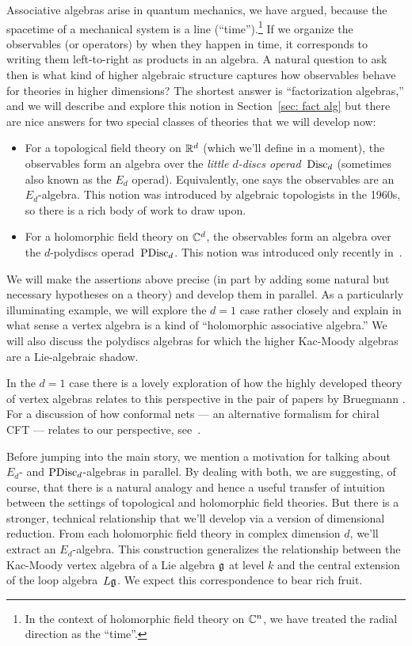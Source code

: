 \documentclass[11pt]{amsart}
\begin{document}
Associative algebras arise in quantum mechanics, we have argued, because the spacetime of a mechanical system is a line (``time'').\footnote{In the context of holomorphic field theory on ${\mathbb{C}}^n$, we have treated the radial direction as the ``time''.}
If we organize the observables (or operators) by when they happen in time,
it corresponds to writing them left-to-right as products in an algebra.
A natural question to ask then is what kind of higher algebraic structure captures how observables behave for theories in higher dimensions?
The shortest answer is ``factorization algebras,'' and we will describe and explore this notion in Section~\ref{sec: fact alg}
but there are nice answers for two special classes of theories that we will develop now:
\begin{itemize}
\item For a topological field theory on $\mathbb R^d$ (which we'll define in a moment),
the observables form an algebra over the {\em little $d$-discs operad}~${\rm Disc}_d$ (sometimes also known as the $E_d$ operad). 
Equivalently, one says the observables are an $E_d$-algebra. 
This notion was introduced by algebraic topologists in the 1960s, 
so there is a rich body of work to draw upon.
\item For a holomorphic field theory on $\mathbb C^d$,
the observables form an algebra over the $d$-polydiscs operad~${\rm PDisc}_d$.
This notion was introduced only recently in~\cite{CG1}.
\end{itemize}
We will make the assertions above precise (in part by adding some natural but necessary hypotheses on a theory)
and develop them in parallel.
As a particularly illuminating example, we will explore the $d=1$ case rather closely and explain in what sense a vertex algebra is a kind of ``holomorphic associative algebra.''
We will also discuss the polydiscs algebras for which the higher Kac-Moody algebras are a Lie-algebraic shadow.

\begin{rmk}
In the $d=1$ case there is a lovely exploration of how the highly developed theory of vertex algebras relates to this perspective in the pair of papers by Bruegmann \cite{Bruegmann1,Bruegmann2}.
For a discussion of how conformal nets --- an alternative formalism for chiral CFT --- relates to our perspective, see~\cite{Henriques, BPS}.
\end{rmk}

Before jumping into the main story, we mention a motivation for talking about $E_d$- and ${\rm PDisc}_d$-algebras in parallel.
By dealing with both, we are suggesting, of course, that there is a natural analogy and hence a useful transfer of intuition between the settings of topological and holomorphic field theories.
But there is a stronger, technical relationship that we'll develop via a version of dimensional reduction.
From each holomorphic field theory in complex dimension $d$, 
we'll extract an $E_d$-algebra.
This construction generalizes the relationship between the Kac-Moody vertex algebra of a Lie algebra $\mathfrak g$ at level $k$ and the central extension of the loop algebra~$L\mathfrak g$.
We expect this correspondence to bear rich fruit.
\end{document}
